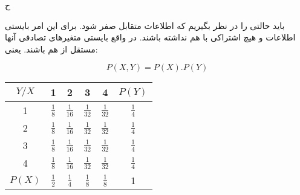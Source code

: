 \SubProblem
{ح}
{
    باید حالتی را در نظر بگیریم که اطلاعات متقابل صفر شود. برای این امر بایستی اطلاعات 
     و 
    هیچ اشتراکی با هم نداشته باشند.
    در واقع بایستی متغیرهای تصادفی آنها مستقل از هم باشند. یعنی:
    
    \begin{equation*}
        P(X,Y) = P(X).P(Y)
    \end{equation*}
    
    \begin{latin}
    \begin{center}
      \renewcommand{\arraystretch}{1.6}
      \begin{tabular}{| c | c | c | c | c | c |}
        \hline
        $Y/X$ & 1 & 2 & 3 & 4 & $P(Y)$ \\ \hline
        1 & $\frac{1}{8}$ & $\frac{1}{16}$ & $\frac{1}{32}$ & $\frac{1}{32}$ & $\frac{1}{4}$ \\ \hline
        2 & $\frac{1}{8}$ & $\frac{1}{16}$ & $\frac{1}{32}$ & $\frac{1}{32}$ & $\frac{1}{4}$ \\ \hline
        3 & $\frac{1}{8}$ & $\frac{1}{16}$ & $\frac{1}{32}$ & $\frac{1}{32}$ & $\frac{1}{4}$ \\ \hline
        4 & $\frac{1}{8}$ & $\frac{1}{16}$ & $\frac{1}{32}$ & $\frac{1}{32}$ & $\frac{1}{4}$ \\ \hline
        $P(X)$ & $\frac{1}{2}$ & $\frac{1}{4}$ & $\frac{1}{8}$ & $\frac{1}{8}$ & 1 \\
        \hline
      \end{tabular}
    \end{center}
    \end{latin}
}